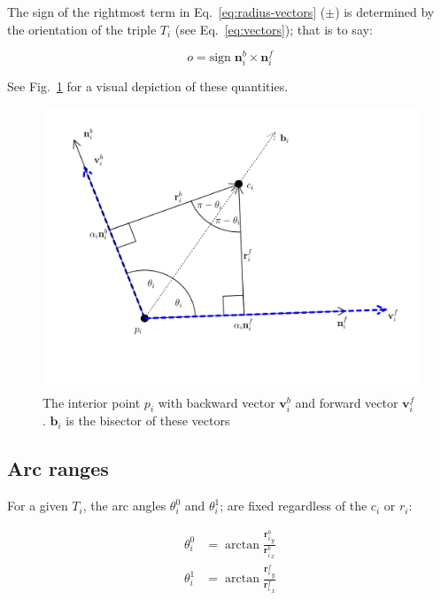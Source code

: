 \documentclass{article}
\begin{document}
The sign of the rightmost term in Eq.~\eqref{eq:radius-vectors} ($\pm$) is determined by the orientation of the triple $T_i$ (see Eq.~\eqref{eq:vectors}); that is to say:

\begin{equation}
  \label{eq:orientation}
  o = \mathrm{sign}\; \mathbf{n}^{b}_{i} \times \mathbf{n}^{f}_{i}
\end{equation}

See Fig.~\ref{fig:interior-point} for a visual depiction of these quantities.

\begin{figure}[h]
  \centering
  \includegraphics[width=\columnwidth]{4}
  \caption{The interior point $p_{i}$ with backward vector $\mathbf{v}^{b}_{i}$ and forward vector $\mathbf{v}^{f}_{i}$. $\mathbf{b}_{i}$ is the bisector of these vectors}
  \label{fig:interior-point}
\end{figure}

\subsection{Arc ranges}

For a given $T_i$, the arc angles $\theta^0_i$ and $\theta^{1}_{i}$; are fixed regardless of the $c_i$ or $r_{i}$:

\begin{align}
  \theta^{0}_{i} &= \arctan \frac{{\mathbf{r}^{b}_{i}}_{y}}{{\mathbf{r}^{b}_{i}}_{x}}\\
  \theta^{1}_{i} &= \arctan \frac{{\mathbf{r}^{f}_{i}}_{y}}{{\mathbf{r}^{f}_{i}}_{x}}
\end{align}
\end{document}
